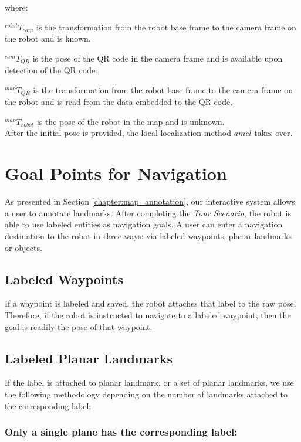 where:

$^{robot}T_{cam}$ is the transformation from the robot base frame to the camera frame on the robot and is known.

$^{cam}T_{QR}$ is the pose of the QR code in the camera frame and is available upon detection of the QR code.

$^{map}T_{QR}$ is the transformation from the robot base frame to the camera frame on the robot and is read from the data embedded to the QR code.

$^{map}T_{robot}$ is the pose of the robot in the map and is unknown.\\

After the initial pose is provided, the local localization method $amcl$ takes over.

\section{Goal Points for Navigation}
\label{sec:navigation_finding_goal_points_for_navigation}

As presented in Section \ref{chapter:map_annotation}, our interactive system allows a user to annotate landmarks. After completing the \textit{Tour Scenario}, the robot is able to use labeled entities as navigation goals. A user can enter a navigation destination to the robot in three ways: via labeled waypoints, planar landmarks or objects.

\subsection{Labeled Waypoints} If a waypoint is labeled and saved, the robot attaches that label to the raw pose. Therefore, if the robot is instructed to navigate to a labeled waypoint, then the goal is readily the pose of that waypoint.
\subsection{Labeled Planar Landmarks} If the label is attached to planar landmark, or a set of planar landmarks, we use the following methodology depending on the number of landmarks attached to the corresponding label:

\subsubsection{Only a single plane has the corresponding label: }
\label{sec:navigation_goal_single_label}

